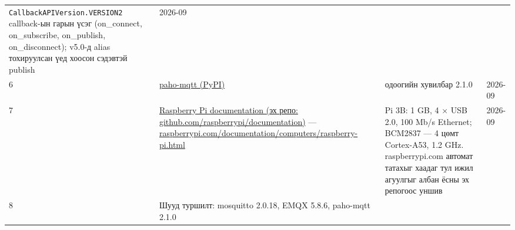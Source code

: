 \begin{longtable}[]{@{}llll@{}}
\begin{minipage}[t]{0.22\columnwidth}
\texttt{CallbackAPIVersion.\allowbreak{}VERSION2} callback-ын гарын үсэг (on\_connect, on\_subscribe, on\_publish, on\_disconnect); v5.0-д alias тохируулсан үед хоосон сэдэвтэй publish\strut
\end{minipage} & \begin{minipage}[t]{0.22\columnwidth}\raggedright
2026-09\strut
\end{minipage}\tabularnewline
\begin{minipage}[t]{0.22\columnwidth}\raggedright
6\strut
\end{minipage} & \begin{minipage}[t]{0.22\columnwidth}\raggedright
\href{https://pypi.org/project/paho-mqtt/}{paho-mqtt (PyPI)}\strut
\end{minipage} & \begin{minipage}[t]{0.22\columnwidth}\raggedright
одоогийн хувилбар 2.1.0\strut
\end{minipage} & \begin{minipage}[t]{0.22\columnwidth}\raggedright
2026-09\strut
\end{minipage}\tabularnewline
\begin{minipage}[t]{0.22\columnwidth}\raggedright
7\strut
\end{minipage} & \begin{minipage}[t]{0.22\columnwidth}\raggedright
\href{https://github.com/raspberrypi/documentation}{Raspberry Pi documentation (эх репо: github.\allowbreak{}com/\allowbreak{}raspberrypi/\allowbreak{}documentation)} --- \href{https://www.raspberrypi.com/documentation/computers/raspberry-pi.html}{raspberrypi.\allowbreak{}com/\allowbreak{}documentation/\allowbreak{}computers/\allowbreak{}raspberry-pi.\allowbreak{}html}\strut
\end{minipage} & \begin{minipage}[t]{0.22\columnwidth}\raggedright
Pi 3B: 1 GB, 4 × USB 2.0, 100 Mb/s Ethernet; BCM2837 --- 4 цөмт Cortex-A53, 1.2 GHz. raspberrypi.com автомат татахыг хаадаг тул ижил агуулгыг албан ёсны эх репогоос уншив\strut
\end{minipage} & \begin{minipage}[t]{0.22\columnwidth}\raggedright
2026-09\strut
\end{minipage}\tabularnewline
\begin{minipage}[t]{0.22\columnwidth}\raggedright
8\strut
\end{minipage} & \begin{minipage}[t]{0.22\columnwidth}\raggedright
Шууд туршилт: mosquitto 2.0.18, EMQX 5.8.6, paho-mqtt 2.1.0\strut

\end{minipage}
\end{longtable}
